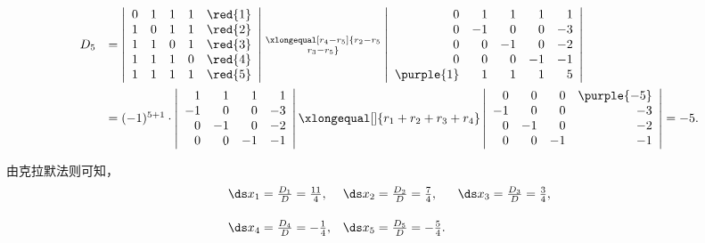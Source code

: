 \begin{jie}
$$
\begin{array}{rl}
  D_5 &= \left|
        \begin{array}{rrrrr}
          0&1&1&1&\red{1}\\
          1&0&1&1&\red{2}\\
          1&1&0&1&\red{3}\\
          1&1&1&0&\red{4}\\
          1&1&1&1&\red{5}\\
        \end{array}
  \right|  \xlongequal[r_4-r_5]{r_2-r_5\atop r_3-r_5}
  \left|
  \begin{array}{rrrrr}
    0&1&1&1&{1}\\
    0&-1&0&0&{-3}\\
    0&0&-1&0&{-2}\\
    0&0&0&-1&{-1}\\
    \purple{1}&1&1&1&{5}\\
  \end{array}
  \right| \\[0.4in]
      & =  (-1)^{5+1} \cdot    
        \left|
        \begin{array}{rrrr}
          1&1&1&{1}\\
          -1&0&0&{-3}\\
          0&-1&0&{-2}\\
          0&0&-1&{-1}\\
        \end{array}
  \right|
  \xlongequal[]{r_1+r_2+r_3+r_4}
  \left|
  \begin{array}{rrrr}
    0&0&0&\purple{-5}\\
    -1&0&0&{-3}\\
    0&-1&0&{-2}\\
    0&0&-1&{-1}\\
  \end{array}\right| = -5.
\end{array}
$$

由克拉默法则可知，
$$
\begin{array}{lll}
  \ds x_1 = \frac{D_1}D = \frac{11}4, &
                                        \ds x_2 = \frac{D_2}D = \frac74, &
                                                                           \ds x_3 = \frac{D_3}D = \frac34, \\[0.2in]
  \ds x_4 = \frac{D_4}D = -\frac14, &
                                      \ds x_5 = \frac{D_5}D = -\frac54.
\end{array}
$$
\end{jie}


